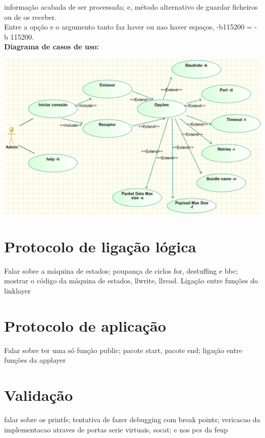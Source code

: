 \documentclass[a4paper]{article}
\begin{document}
informação acabada de ser processada; e, método alternativo de guardar
ficheiros ou de os receber.\\Entre a opção e o argumento tanto faz haver ou nao
haver espaços, -b115200 = -b 115200.
\\\newline\textbf{Diagrama de casos de uso:}\\\newline
\centerline{\includegraphics[scale=0.6]{useCases.png}}

\section{Protocolo de ligação lógica}
Falar sobre a máquina de estados; poupança de ciclos for, destuffing e bbc; mostrar o código da máquina de
estados, llwrite, llread. Ligação entre funções do linklayer

\section{Protocolo de aplicação}
Falar sobre ter uma só função public; pacote start, pacote end; ligação entre
funções da applayer

\section{Validação}
falar sobre os printfs; tentativa de fazer debugging com break points;
vericacao da implementacao atraves de portas serie virtuais, socat; e nos pcs
da feup
\end{document}
